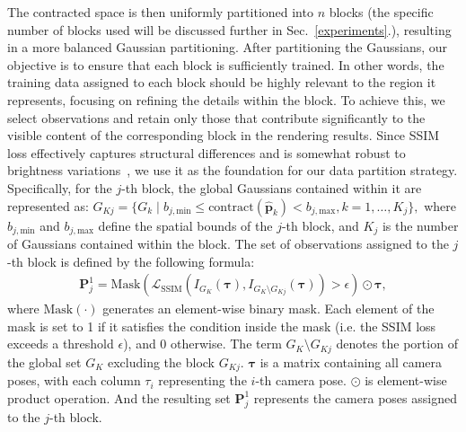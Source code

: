 The contracted space is then uniformly partitioned into $n$ blocks (the specific number of blocks used will be discussed further in Sec.~\ref{experiments}.), resulting in a more balanced Gaussian partitioning.
After partitioning the Gaussians, our objective is to ensure that each block is sufficiently trained. In other words, the training data assigned to each block should be highly relevant to the region it represents, focusing on refining the details within the block. To achieve this, we select observations and retain only those that contribute significantly to the visible content of the corresponding block in the rendering results. Since SSIM loss effectively captures structural differences and is somewhat robust to brightness variations~\cite{mss}, we use it as the foundation for our data partition strategy. Specifically, for the $j$-th block, the global Gaussians contained within it are represented as:
\(
G_{Kj} = \{ G_k \mid b_{j, \text{min}} \leq \text{contract}(\hat{\mathbf{p}}_k) < b_{j, \text{max}}, k = 1, \dots, K_j \},
\)
where $b_{j, \text{min}}$ and $b_{j, \text{max}}$ define the spatial bounds of the $j$-th block, and $K_j$ is the number of Gaussians contained within the block. 
The set of observations assigned to the \(j\)-th block is defined by the following formula:
\small{
\begin{equation}
\begin{aligned}
    \mathbf{P}^1_j = \text{Mask}\left(\mathcal{L}_{\text{SSIM}} \left( I_{G_K} (\boldsymbol{\tau}), I_{G_K \setminus G_{Kj}} (\boldsymbol{\tau}) \right ) > \epsilon \right )
    \odot \boldsymbol{\tau},
\end{aligned}
\label{13}
\end{equation}
}
where \( \text{Mask}(\cdot) \) generates an element-wise binary mask. Each element of the mask is set to 1 if it satisfies the condition inside the mask (i.e. the SSIM loss exceeds a threshold \( \epsilon \)), and 0 otherwise.
The term \( G_K \setminus G_{Kj} \) denotes the portion of the global set \( G_K \) excluding the block \( G_{Kj} \). \( \boldsymbol{\tau} \) is a matrix containing all camera poses, with each column \( \tau_i \) representing the \( i \)-th camera pose.
\( \odot \) is element-wise product operation.
And the resulting set \( \mathbf{P}^1_j \) represents the camera poses assigned to the \( j \)-th block. 



